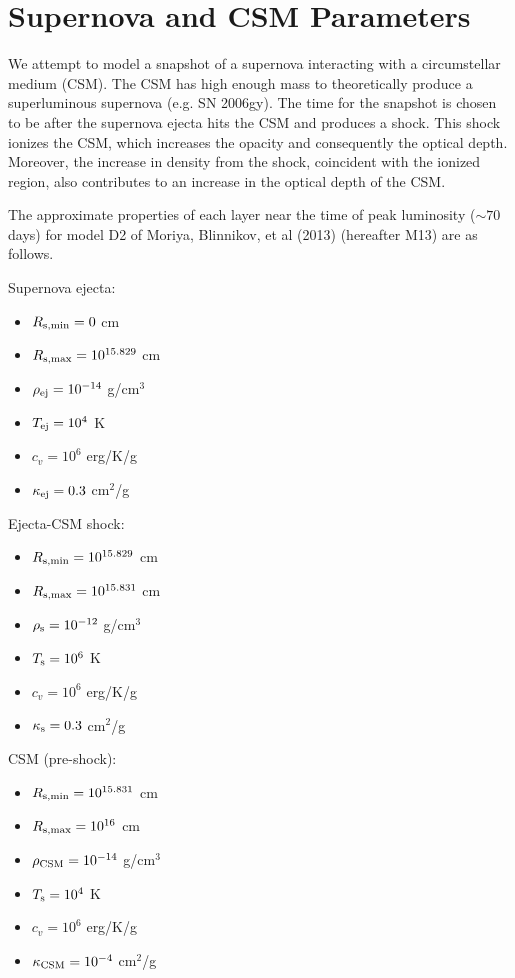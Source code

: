 \documentclass[11pt]{article}
\begin{document}
\section{Supernova and CSM Parameters}
\label{sec:sncsmpars}

We attempt to model a snapshot of a supernova interacting
with a circumstellar medium (CSM).
The CSM has high enough mass to theoretically produce a
superluminous supernova (e.g. SN 2006gy).
The time for the snapshot is chosen to be after the
supernova ejecta hits the CSM and produces a shock.
This shock ionizes the CSM, which increases the opacity
and consequently the optical depth.
Moreover, the increase in density from the shock, coincident
with the ionized region, also contributes to an increase in
the optical depth of the CSM.

\vspace{5 mm}

The approximate properties of each layer near the time of
peak luminosity ($\sim70$ days) for model D2 of Moriya, Blinnikov,
et al (2013) (hereafter M13) are as follows.

\vspace{5 mm}

Supernova ejecta:
\begin{itemize}
\item $R_{\rm s, min} = 0$ cm
\item $R_{\rm s, max} = 10^{15.829}$ cm
\item $\rho_{\rm ej} = 10^{-14}$ g/cm$^3$
\item $T_{\rm ej} = 10^4$ K
\item $c_v = 10^6$ erg/K/g
\item $\kappa_{\rm ej} = 0.3$ cm$^2$/g
\end{itemize}

Ejecta-CSM shock:
\begin{itemize}
\item $R_{\rm s, min} = 10^{15.829}$ cm
\item $R_{\rm s, max} = 10^{15.831}$ cm
\item $\rho_{\rm s} = 10^{-12}$ g/cm$^3$
\item $T_{\rm s} = 10^6$ K
\item $c_v = 10^6$ erg/K/g
\item $\kappa_{\rm s} = 0.3$ cm$^2$/g
\end{itemize}

CSM (pre-shock):
\begin{itemize}
\item $R_{\rm s, min} = 10^{15.831}$ cm
\item $R_{\rm s, max} = 10^{16}$ cm
\item $\rho_{\rm CSM} = 10^{-14}$ g/cm$^3$
\item $T_{\rm s} = 10^4$ K
\item $c_v = 10^6$ erg/K/g
\item $\kappa_{\rm CSM} = 10^{-4}$ cm$^2$/g
\end{itemize}
\end{document}
